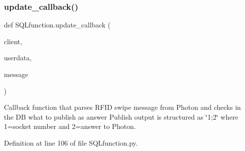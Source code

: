 \subsubsection{update\+\_\+callback()}
{\footnotesize\ttfamily def S\+Q\+Lfunction.\+update\+\_\+callback (\begin{DoxyParamCaption}\item[{}]{client,  }\item[{}]{userdata,  }\item[{}]{message }\end{DoxyParamCaption})}



Callback function that parses R\+F\+ID swipe message from Photon and checks in the DB what to publish as answer Publish output is structured as \char`\"{}1;2\char`\"{} where 1=socket number and 2=answer to Photon. 



Definition at line 106 of file S\+Q\+Lfunction.\+py.


